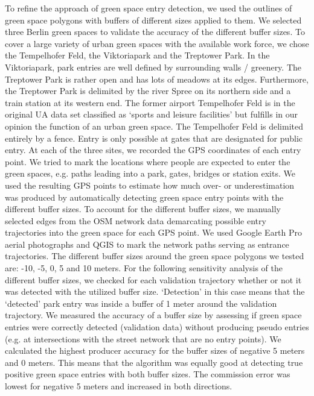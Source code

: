\documentclass[10pt]{article}
\begin{document}
To refine the approach of green space entry detection, we used the outlines of green space polygons with buffers of different sizes applied to them.
We selected three Berlin green spaces to validate the accuracy of the different buffer sizes.
To cover a large variety of urban green spaces with the available work force, we chose the Tempelhofer Feld, the Viktoriapark and the Treptower Park.
In the Viktoriapark, park entries are well defined by surrounding walls / greenery.
The Treptower Park is rather open and has lots of meadows at its edges.
Furthermore, the Treptower Park is delimited by the river Spree on its northern side and a train station at its western end.
The former airport Tempelhofer Feld is in the original UA data set classified as ‘sports and leisure facilities’ but fulfills in our opinion the function of an urban green space.
The Tempelhofer Feld is delimited entirely by a fence.
Entry is only possible at gates that are designated for public entry.
At each of the three sites, we recorded the GPS coordinates of each entry point. 
We tried to mark the locations where people are expected to enter the green spaces, e.g. paths leading into a park, gates, bridges or station exits.
We used the resulting GPS points to estimate how much over- or underestimation was produced by automatically detecting green space entry points with the different buffer sizes. 
To account for the different buffer sizes, we manually selected edges from the OSM network data demarcating possible entry trajectories into the green space for each GPS point.
We used Google Earth Pro aerial photographs and QGIS to mark the network paths serving as entrance trajectories.
The different buffer sizes around the green space polygons we tested are: -10, -5, 0, 5 and 10 meters.
For the following sensitivity analysis of the different buffer sizes, we checked for each validation trajectory whether or not it was detected with the utilized buffer size.
‘Detection’ in this case means that the ‘detected’ park entry was inside a buffer of 1 meter around the validation trajectory.
We measured the accuracy of a buffer size by assessing if green space entries were correctly detected (validation data) without producing pseudo entries (e.g. at intersections with the street network that are no entry points).
We calculated the highest producer accuracy for the buffer sizes of negative 5 meters and 0 meters.
This means that the algorithm was equally good at detecting true positive green space entries with both buffer sizes.
The commission error was lowest for negative 5 meters and increased in both directions.
\end{document}
